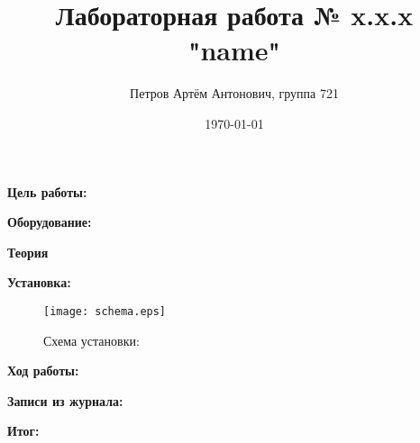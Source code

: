 \documentclass[a4paper,12pt]{article}
\author{Петров Артём Антонович, группа 721}
\title{Лабораторная работа № x.x.x "name"}
\date{\today}
\begin{document}

\begin{minipage}[t][5cm]{\textwidth}
\maketitle
\end{minipage}


\textbf{Цель работы:} 
\bigskip

\medskip
\textbf{Оборудование:} 
\bigskip

\textbf{Теория}
\bigskip


\bigskip

\textbf{Установка:}
\bigskip


\begin{figure}[ht]
\centering
\texttt{[image: schema.eps]}
\caption{Схема установки: }\label{schema}
\end{figure}

\bigskip

\textbf{Ход работы:}
\bigskip


\bigskip

\textbf{Записи из журнала:}
\bigskip


\bigskip

\textbf{Итог:}
\bigskip
 
\end{document}
